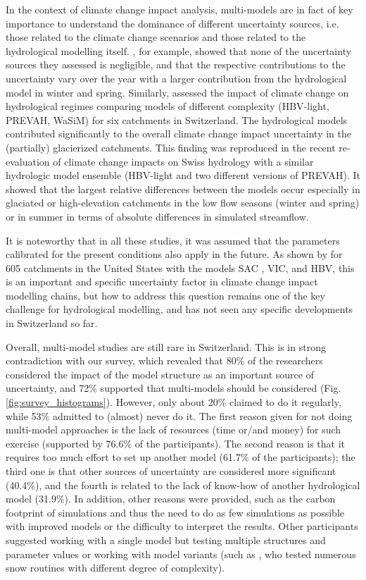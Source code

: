 \documentclass[10pt,a4paper]{article}
\begin{document}
In the context of climate change impact analysis, multi-models are in fact of key importance to understand the dominance of different uncertainty sources, i.e. those related to the climate change scenarios and those related to the hydrological modelling itself. \citet{Bosshard2013a}, for example, showed that none of the uncertainty sources they assessed is negligible, and that the respective contributions to the uncertainty vary over the year with a larger contribution from the hydrological model in winter and spring. Similarly, \citet{Addor2014} assessed the impact of climate change on hydrological regimes comparing models of different complexity (HBV-light, PREVAH, WaSiM) for six catchments in Switzerland. The hydrological models contributed significantly to the overall climate change impact uncertainty in the (partially) glacierized catchments. This finding was reproduced in the recent re-evaluation of climate change impacts on Swiss hydrology \citep[Hydro-CH2018,][]{FOEN2021} with a similar hydrologic model ensemble (HBV-light and two different versions of PREVAH). It showed that the largest relative differences between the models occur especially in glaciated or high-elevation catchments in the low flow seasons (winter and spring) or in summer in terms of absolute differences in simulated streamflow.

It is noteworthy that in all these studies, it was assumed that the parameters calibrated for the present conditions also apply in the future. As shown by \citet{Melsen2021} for 605 catchments in the United States with the models SAC \citep[Sacramento Soil Moisture Accounting model;][]{Burnash1973}, VIC, and HBV, this is an important and specific uncertainty factor in climate change impact modelling chains, but how to address this question remains one of the key challenge for hydrological modelling, and has not seen any specific developments in Switzerland so far. 

Overall, multi-model studies are still rare in Switzerland. This is in strong contradiction with our survey, which revealed that 80\% of the researchers considered the impact of the model structure as an important source of uncertainty, and 72\% supported that multi-models should be considered (Fig. \ref{fig:survey_histograms}). However, only about 20\% claimed to do it regularly, while 53\% admitted to (almost) never do it. The first reason given for not doing multi-model approaches is the lack of resources (time or/and money) for such exercise (supported by 76.6\% of the participants). The second reason is that it requires too much effort to set up another model (61.7\% of the participants); the third one is that other sources of uncertainty are considered more significant (40.4\%), and the fourth is related to the lack of know-how of another hydrological model (31.9\%). In addition, other reasons were provided, such as the carbon footprint of simulations and thus the need to do as few simulations as possible with improved models or the difficulty to interpret the results. Other participants suggested working with a single model but testing multiple structures and parameter values or working with model variants (such as \citet{GironsLopez2020}, who tested numerous snow routines with different degree of complexity).
\end{document}
